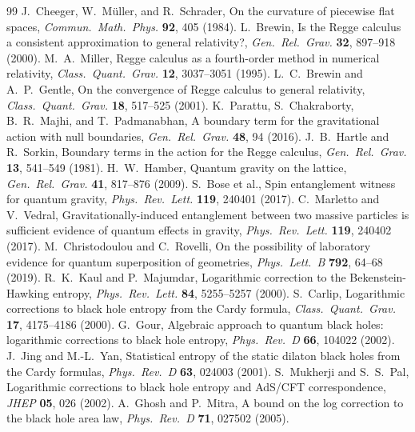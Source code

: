 \documentclass[11pt,letterpaper]{article}
\begin{document}
\begin{thebibliography}{99}
 J.~Cheeger, W.~M\"uller, and R.~Schrader, On the curvature of piecewise flat spaces, \emph{Commun.\ Math.\ Phys.} \textbf{92}, 405 (1984).
 L.~Brewin, Is the Regge calculus a consistent approximation to general relativity?, \emph{Gen.\ Rel.\ Grav.} \textbf{32}, 897--918 (2000).
 M.~A.~Miller, Regge calculus as a fourth-order method in numerical relativity, \emph{Class.\ Quant.\ Grav.} \textbf{12}, 3037--3051 (1995).
 L.~C.~Brewin and A.~P.~Gentle, On the convergence of Regge calculus to general relativity, \emph{Class.\ Quant.\ Grav.} \textbf{18}, 517--525 (2001).
 K.~Parattu, S.~Chakraborty, B.~R.~Majhi, and T.~Padmanabhan, A boundary term for the gravitational action with null boundaries, \emph{Gen.\ Rel.\ Grav.} \textbf{48}, 94 (2016).
 J.~B.~Hartle and R.~Sorkin, Boundary terms in the action for the Regge calculus, \emph{Gen.\ Rel.\ Grav.} \textbf{13}, 541--549 (1981).
 H.~W.~Hamber, Quantum gravity on the lattice, \emph{Gen.\ Rel.\ Grav.} \textbf{41}, 817--876 (2009).
 S.~Bose et al., Spin entanglement witness for quantum gravity, \emph{Phys.\ Rev.\ Lett.} \textbf{119}, 240401 (2017).
 C.~Marletto and V.~Vedral, Gravitationally-induced entanglement between two massive particles is sufficient evidence of quantum effects in gravity, \emph{Phys.\ Rev.\ Lett.} \textbf{119}, 240402 (2017).
 M.~Christodoulou and C.~Rovelli, On the possibility of laboratory evidence for quantum superposition of geometries, \emph{Phys.\ Lett.\ B} \textbf{792}, 64--68 (2019).
 R.~K.~Kaul and P.~Majumdar, Logarithmic correction to the Bekenstein-Hawking entropy, \emph{Phys.\ Rev.\ Lett.} \textbf{84}, 5255--5257 (2000).
 S.~Carlip, Logarithmic corrections to black hole entropy from the Cardy formula, \emph{Class.\ Quant.\ Grav.} \textbf{17}, 4175--4186 (2000).
 G.~Gour, Algebraic approach to quantum black holes: logarithmic corrections to black hole entropy, \emph{Phys.\ Rev.\ D} \textbf{66}, 104022 (2002).
 J.~Jing and M.-L.~Yan, Statistical entropy of the static dilaton black holes from the Cardy formulas, \emph{Phys.\ Rev.\ D} \textbf{63}, 024003 (2001).
 S.~Mukherji and S.~S.~Pal, Logarithmic corrections to black hole entropy and AdS/CFT correspondence, \emph{JHEP} \textbf{05}, 026 (2002).
 A.~Ghosh and P.~Mitra, A bound on the log correction to the black hole area law, \emph{Phys.\ Rev.\ D} \textbf{71}, 027502 (2005).

\end{thebibliography}
\end{document}
